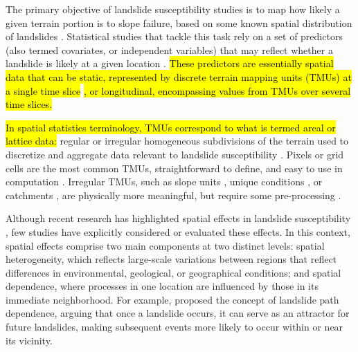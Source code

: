 \documentclass[journal abbreviation, manuscript]{copernicus}
\begin{document}
\introduction 
The primary objective of landslide susceptibility studies is to map how likely a given terrain portion is to slope failure, based on some known spatial distribution of landslides \citep{fell2008guidelines, corominas2014recommendations, soeters1996slope}. Statistical studies that tackle this task rely on a set of predictors (also termed covariates, or independent variables) that may reflect whether a landslide is likely at a given location \citep{reichenbach2018review, steger2019statistical}. \hl{These predictors are essentially spatial data that can be static, represented by discrete terrain mapping units (TMUs) at a single time slice }\citep{elhorst2014spatial}\hl{, or longitudinal, encompassing values from TMUs over several time slices.}

\hl{In spatial statistics terminology, TMUs correspond to what is termed areal or lattice data:} regular or irregular homogeneous subdivisions of the terrain used to discretize and aggregate data relevant to landslide susceptibility \citep{carrara1995gis, erener2012landslide}. Pixels or grid cells are the most common TMUs, straightforward to define, and easy to use in computation \citep{ba2018comparison}. Irregular TMUs, such as slope units \citep{tanyas2019global, alvioli2016automatic}, unique conditions \citep{clerici2002procedure}, or catchments \citep{von2013rainfall, shou2020evaluation}, are physically more meaningful, but require some pre-processing \citep{caleca2025pan}.

Although recent research has highlighted spatial effects in landslide susceptibility \citep{lombardo2019geostatistical}, few studies have explicitly considered or evaluated these effects. In this context, spatial effects comprise two main components at two distinct levels: spatial heterogeneity, which reflects large-scale variations between regions that reflect differences in environmental, geological, or geographical conditions; and spatial dependence, where processes in one location are influenced by those in its immediate neighborhood. For example, \citet{samia2019dynamic} proposed the concept of landslide path dependence, arguing that once a landslide occurs, it can serve as an attractor for future landslides, making subsequent events more likely to occur within or near its vicinity.
\end{document}
